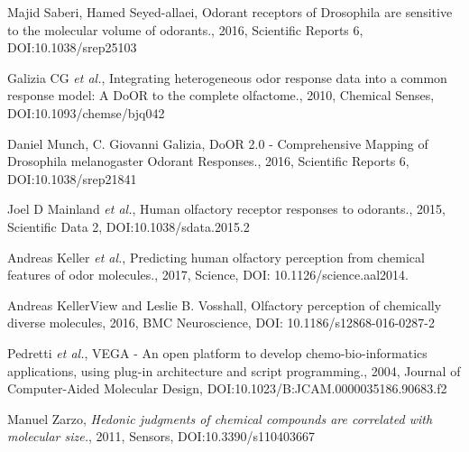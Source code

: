 \documentclass[a1paper,fontscale=0.5]{baposter} %
\newcommand{\compresslist}{ %
\setlength{\itemsep}{1pt}
\setlength{\parskip}{0pt}
\setlength{\parsep}{0pt}
}
\begin{document}
\begin{poster}
{\begin{thebibliography}{1}
   Majid Saberi, Hamed Seyed-allaei, {
  Odorant receptors of Drosophila are sensitive to the molecular volume of odorants.}, 
  2016, Scientific Reports 6, DOI:10.1038/srep25103

   Galizia CG {\em et al.}, { Integrating heterogeneous odor response data into a common response model: A DoOR to the complete olfactome.}, 2010, Chemical Senses, DOI:10.1093/chemse/bjq042

  Daniel Munch, C. Giovanni Galizia, {
DoOR 2.0 - Comprehensive Mapping of Drosophila melanogaster Odorant Responses.},
2016, Scientific Reports 6, DOI:10.1038/srep21841

   Joel D Mainland {\em et al.}, {
Human olfactory receptor responses to odorants.},
2015, Scientific Data 2, DOI:10.1038/sdata.2015.2

   Andreas Keller {\em et al.}, {
 Predicting human olfactory perception from chemical features of odor molecules.},
2017, Science, DOI: 10.1126/science.aal2014. 

    Andreas KellerView and Leslie B. Vosshall,
{Olfactory perception of chemically diverse molecules},
2016, BMC Neuroscience, DOI: 10.1186/s12868-016-0287-2

  Pedretti {\em et al.}, { VEGA - An open platform to develop chemo-bio-informatics applications, using plug-in architecture and script programming.}, 2004, Journal of Computer-Aided Molecular Design, DOI:10.1023/B:JCAM.0000035186.90683.f2

  Manuel Zarzo, {\em Hedonic judgments of chemical compounds are correlated with molecular size.}, 2011, Sensors, DOI:10.3390/s110403667

  \end{thebibliography}
}





\end{poster}
\end{document}
